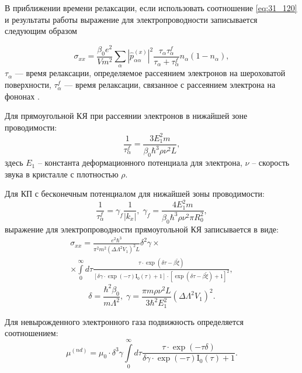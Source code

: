 В приближении времени релаксации, если использовать соотношение \eqref{eq:31_120} и результаты работы \cite{Khamidullin2002} выражение для электропроводности записывается следующим образом

\begin{equation} \label{eq:31_320}
\sigma _{xx} =\frac{\beta_0 e^2 }{Vm^2 } \sum _{\alpha }\left|\hat{p}_{\alpha \alpha }^{(x)} \right|^2 \frac{\tau _{\alpha } \tau_{\alpha }^f }{\tau_{\alpha } +\tau_{\alpha }^f } n_{\alpha } \left(1-n_{\alpha } \right),
\end{equation}
$\tau _{\alpha } $ --- время релаксации, определяемое рассеянием электронов на шероховатой поверхности, $\tau_{\alpha }^f $ --- время релаксации, связанное с рассеянием электрона на фононах \cite{Khamidullin2002}.

Для прямоугольной КЯ при рассеянии электронов в нижайшей зоне проводимости:
\begin{equation} \label{eq:31_330}
\frac{1}{\tau_{\alpha }^f } = \frac{3 E_1^2 m}{\beta_0 \hbar^3 \rho \nu^2 L},
\end{equation}
здесь $E_1 $ -- константа деформационного потенциала для электрона, $\nu $ -- скорость звука в кристалле с плотностью $\rho $.

Для КП с бесконечным потенциалом для нижайшей зоны проводимости:
\begin{equation} \label{eq:31_340}
\frac{1}{\tau _{\alpha }^f } =\gamma_f \frac{1}{\left|k_{x} \right|}, \;
\gamma_f =\frac{4 E_1^2 m}{\beta_0 \hbar^3 \rho \nu^2 \pi R_0^2 },
\end{equation}
выражение для электропроводности прямоугольной КЯ записывается в виде:
\begin{multline} \label{eq:31_350}
\sigma _{xx} =\frac{e^2 \hbar^3 }{\pi^2 m^2 \left(\Delta \Lambda^2 V_1 \right)^2 L} \delta^2 \gamma \times \\
 \times \int\limits_0^{\infty }{d\tau \frac{\tau \cdot \exp (\delta \tau -\beta \tilde{\xi })}{\left[\delta \gamma \cdot \exp(-\tau ) \mathrm{I}_0 (\tau )+1\right]\cdot \left[\exp(\delta \tau -\beta \tilde{\xi })+1\right]^2 }},
\end{multline}
\[
\delta =\frac{\hbar^2 \beta_0 }{m \Lambda^2 }, \;
\gamma =\frac{\pi m\rho \nu^2 L}{3\hbar^2 E_1^2 } \left(\Delta \Lambda^2 V_1 \right)^2 .
\]
 
Для невырожденного электронного газа подвижность определяется соотношением:
\begin{equation} \label{eq:31_360}
\mu ^{(nd)} =\mu_0 \cdot \delta^3 \gamma \int\limits_0^{\infty}{d\tau \frac{\tau \cdot \exp(-\tau \delta )}{\delta \gamma \cdot \exp(-\tau ) \mathrm{I}_0 (\tau )+1}}. 
\end{equation}

